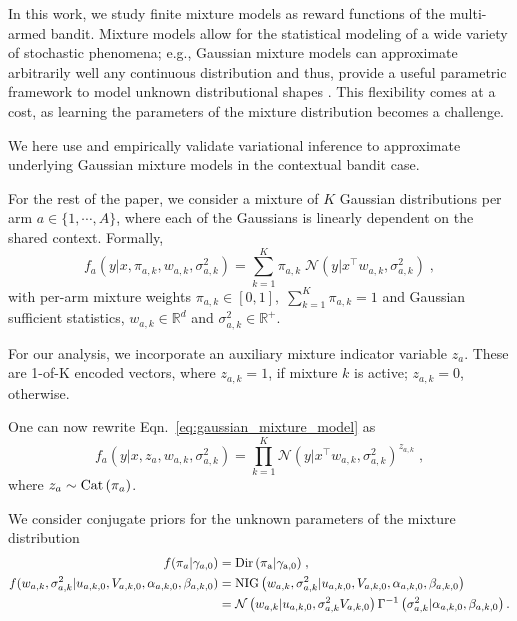 \documentclass{article}
\def \Real{{\mathbb R}}
\newcommand{\N}[1]{\mathcal{N}\left( #1\right)}
\newcommand{\Dir}[1]{{\rm Dir\left( #1\right)}}
\newcommand{\Cat}[1]{{\rm Cat}\left( #1\right)}
\newcommand{\NIG}[1]{{\rm NIG}\left( #1\right)}
\begin{document}
In this work, we study finite mixture models as reward functions of the multi-armed bandit. Mixture models allow for the statistical modeling of a wide variety of stochastic phenomena; e.g., Gaussian mixture models can approximate arbitrarily well any continuous distribution and thus, provide a useful parametric framework to model unknown distributional shapes \cite{b-McLachlan2004}. This flexibility comes at a cost, as learning the parameters of the mixture distribution becomes a challenge.

We here use and empirically validate variational inference to approximate underlying Gaussian mixture models in the contextual bandit case.

For the rest of the paper, we consider a mixture of $K$ Gaussian distributions per arm $a \in \{1, \cdots, A\}$, where each of the Gaussians is linearly dependent on the shared context. Formally,
\begin{equation}
f_a(y|x,\pi_{a,k}, w_{a,k}, \sigma_{a,k}^2) =\sum_{k=1}^K \pi_{a,k} \; \N{y|x^\top w_{a,k}, \sigma_{a,k}^2}  \;,
\label{eq:gaussian_mixture_model}
\end{equation}
with per-arm mixture weights $\pi_{a,k}\in [0,1], \; \sum_{k=1}^K \pi_{a,k} = 1$ and Gaussian sufficient statistics, $w_{a,k}\in \Real^{d}$ and $\sigma_{a,k}^2\in \Real^+$.

For our analysis, we incorporate an auxiliary mixture indicator variable $z_a$. These are 1-of-K encoded vectors, where $z_{a,k}=1$, if mixture $k$ is active; $z_{a,k}=0$, otherwise.

One can now rewrite Eqn.~\eqref{eq:gaussian_mixture_model} as
\begin{equation}
f_a(y|x,z_{a},w_{a,k}, \sigma_{a,k}^2) =\prod_{k=1}^K \N{y|x^\top w_{a,k}, \sigma_{a,k}^2}^{z_{a,k}} \;,
\label{eq:gaussian_mixture_model_z}
\end{equation}
where $z_{a} \sim \Cat{\pi_{a}}$.

We consider conjugate priors for the unknown parameters of the mixture distribution
\begin{equation}
\begin{split}
f(\pi_{a}|\gamma_{a,0}) &=\Dir{\pi_a|\gamma_{a,0}} \; ,\\
f(w_{a,k}, \sigma_{a,k}^2|u_{a,k,0}, V_{a,k,0},\alpha_{a,k,0}, \beta_{a,k,0}) & = \NIG{w_{a,k}, \sigma_{a,k}^2 |u_{a,k,0}, V_{a,k,0},\alpha_{a,k,0}, \beta_{a,k,0}} \\
& = \N{w_{a,k}|u_{a,k,0}, \sigma_{a,k}^2V_{a,k,0}} \Gamma^{-1}\left(\sigma_{a,k}^2|\alpha_{a,k,0}, \beta_{a,k,0}\right). \\
\end{split}
\label{eq:mixture_model_conjugate_priors}
\end{equation}
\end{document}
